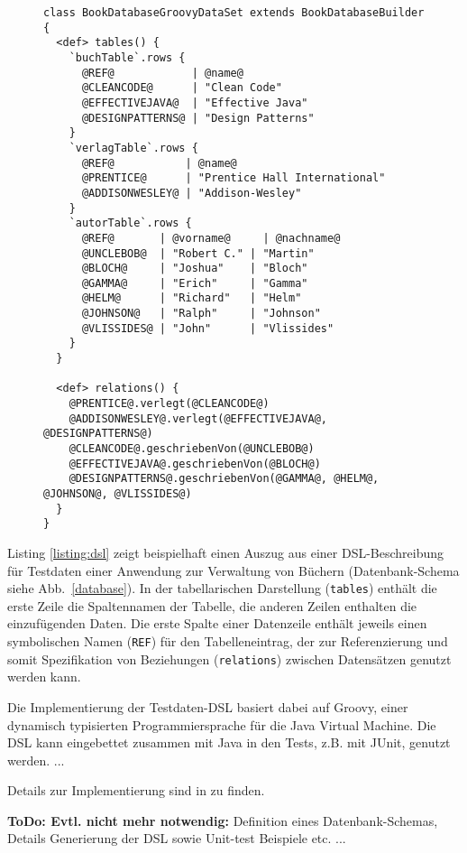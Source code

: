 \begin{figure}[tb]
\begin{lstlisting}[caption=Mittels DSL beschriebenes Testdaten-Set (Table Builder API)., style=java, label=listing:dsl]
class BookDatabaseGroovyDataSet extends BookDatabaseBuilder
{
  <def> tables() {
    `buchTable`.rows {
      @REF@            | @name@
      @CLEANCODE@      | "Clean Code"      
      @EFFECTIVEJAVA@  | "Effective Java"  
      @DESIGNPATTERNS@ | "Design Patterns" 
    }
    `verlagTable`.rows {
      @REF@           | @name@
      @PRENTICE@      | "Prentice Hall International"
      @ADDISONWESLEY@ | "Addison-Wesley"
    }
    `autorTable`.rows {
      @REF@       | @vorname@     | @nachname@
      @UNCLEBOB@  | "Robert C." | "Martin"
      @BLOCH@     | "Joshua"    | "Bloch"
      @GAMMA@     | "Erich"     | "Gamma"
      @HELM@      | "Richard"   | "Helm"
      @JOHNSON@   | "Ralph"     | "Johnson"
      @VLISSIDES@ | "John"      | "Vlissides"    
    }
  }

  <def> relations() {
    @PRENTICE@.verlegt(@CLEANCODE@)
    @ADDISONWESLEY@.verlegt(@EFFECTIVEJAVA@, @DESIGNPATTERNS@)
    @CLEANCODE@.geschriebenVon(@UNCLEBOB@)
    @EFFECTIVEJAVA@.geschriebenVon(@BLOCH@)
    @DESIGNPATTERNS@.geschriebenVon(@GAMMA@, @HELM@, @JOHNSON@, @VLISSIDES@)
  }
}
\end{lstlisting}
\end{figure}


Listing \ref{listing:dsl} zeigt beispielhaft einen Auszug aus einer DSL-Beschreibung für Testdaten einer Anwendung zur Verwaltung von Büchern (Datenbank-Schema siehe Abb.~\ref{database}). In der tabellarischen Darstellung (\texttt{tables}) enthält die erste Zeile die Spaltennamen der Tabelle, die anderen Zeilen enthalten die einzufügenden Daten. Die erste Spalte einer Datenzeile enthält jeweils einen symbolischen Namen (\texttt{REF}) für den Tabelleneintrag, der zur Referenzierung und somit Spezifikation von Beziehungen (\texttt{relations}) zwischen Datensätzen genutzt werden kann.


Die Implementierung der Testdaten-DSL basiert dabei auf Groovy, einer dynamisch typisierten Programmiersprache für die Java Virtual Machine. Die DSL kann eingebettet zusammen mit Java in den Tests, z.B. mit JUnit, genutzt werden. 
...
%

Details zur Implementierung sind in \cite{MT:Moll:2013} zu finden.

\textbf{ToDo: Evtl. nicht mehr notwendig:} Definition eines Datenbank-Schemas, Details Generierung der DSL sowie Unit-test Beispiele etc. ...




